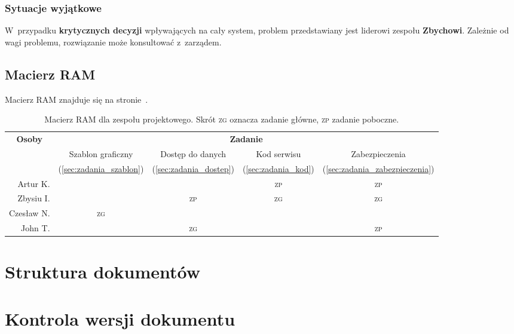 \documentclass[10pt,a4paper]{article}
\begin{document}
\subsubsection{Sytuacje wyjątkowe}
W~przypadku {\bf krytycznych decyzji} wpływających na cały system, problem
przedstawiany jest liderowi zespołu {\bf Zbychowi}. Zależnie od wagi problemu,
rozwiązanie może konsultować z~zarządem.

\subsection{Macierz RAM}
Macierz RAM znajduje się na stronie~\pageref{tab:macierz_ram}.
\begin{table}[p]
  \centering
  \begin{tabular}{r|*{4}{c}}
    \toprule
    \multicolumn{1}{c|}{\multirow{3}{*}{\bf Osoby}} & \multicolumn{4}{c}{\bf Zadanie} \\
    \cmidrule{2-5}
    &
    Szablon graficzny &
    Dostęp do danych &
    Kod serwisu &
    Zabezpieczenia \\
    &
    (\ref{sec:zadania_szablon}) &
    (\ref{sec:zadania_dostep}) &
    (\ref{sec:zadania_kod}) &
    (\ref{sec:zadania_zabezpieczenia}) \\
    \midrule
    Artur K. & & & \textsc{zp} & \textsc{zp} \\
    Zbysiu I. & & \textsc{zp} & \textsc{zg} & \textsc{zg} \\
    Czesław N. & \textsc{zg} & & & \\
    John T. & & \textsc{zg} & & \textsc{zp} \\
    \bottomrule
  \end{tabular}
  \label{tab:macierz_ram}
  \caption{Macierz RAM dla zespołu projektowego. Skrót \textsc{zg} oznacza zadanie główne, \textsc{zp} zadanie poboczne.}
\end{table}

\section{Struktura dokumentów}

\section{Kontrola wersji dokumentu}
\end{document}

